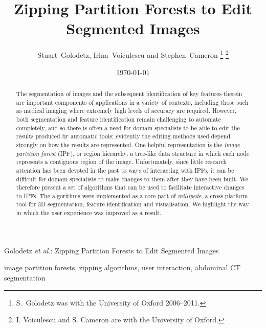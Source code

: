 \documentclass[10pt,twocolumn,twoside]{IEEEtran}
\begin{document}
\title{Zipping Partition Forests to Edit Segmented Images}

\author{Stuart~Golodetz, Irina~Voiculescu and Stephen~Cameron%
\thanks{S.~Golodetz was with the University of Oxford 2006--2011.}%
\thanks{I. Voiculescu and S. Cameron are with the University of Oxford.}}

\date{\today}

%
{Golodetz \MakeLowercase{\textit{et al.}}: Zipping Partition Forests to Edit Segmented Images}


\maketitle

\begin{abstract}
\noindent The segmentation of images and the subsequent identification of key features therein are important components of applications in a variety of contexts, including those such as medical imaging where extremely high levels of accuracy are required. However, both segmentation and feature identification remain challenging to automate completely, and so there is often a need for domain specialists to be able to edit the results produced by automatic tools; evidently the editing methods used depend strongly on how the results are represented. One helpful representation is the \emph{image partition forest} (IPF), or region hierarchy, a tree-like data structure in which each node represents a contiguous region of the image. Unfortunately, since little research attention has been devoted in the past to ways of interacting with IPFs, it can be difficult for domain specialists to make changes to them after they have been built. We therefore present a set of algorithms that can be used to facilitate interactive changes to IPFs. The algorithms were implemented as a core part of \emph{millipede}, a cross-platform tool for 3D segmentation, feature identification and visualisation. We highlight the way in which the user experience was improved as a result.
\end{abstract}

\begin{IEEEkeywords}
image partition forests, zipping algorithms, user interaction, abdominal CT segmentation
\end{IEEEkeywords}

\IEEEpeerreviewmaketitle
\end{document}
